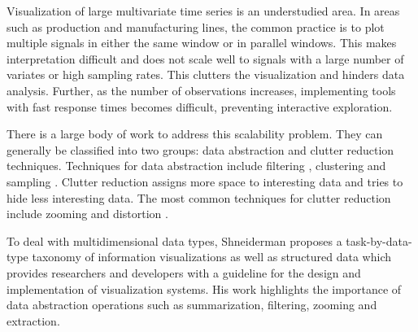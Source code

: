 
Visualization of large multivariate time series is an understudied area. In areas such as production and manufacturing lines, the common practice is to plot multiple signals in either the same window or in parallel windows. This makes interpretation difficult and does not scale well to signals with a large number of variates or high sampling rates. %
This clutters the visualization and hinders data analysis. Further, as the number of observations increases, implementing tools with fast response times becomes difficult, preventing interactive exploration.

There is a large body of work to address this scalability problem.
They can generally be classified into two groups: data abstraction and clutter reduction 
techniques. Techniques for data abstraction include filtering \cite{conf/chi/AhlbergS94b}, clustering
and sampling \cite{553159}. Clutter reduction assigns more space to interesting data and tries to hide less interesting data.
The most common techniques for clutter reduction include zooming and distortion  \cite{559215,1382895,1196005}.
%
%

To deal with multidimensional data types, Shneiderman \cite{545307} proposes a task-by-data-type taxonomy of information visualizations as well as structured data which provides researchers and developers with a guideline for
the design and implementation of visualization systems. His work highlights the importance of data
abstraction operations such as summarization, filtering, zooming and extraction.
%

